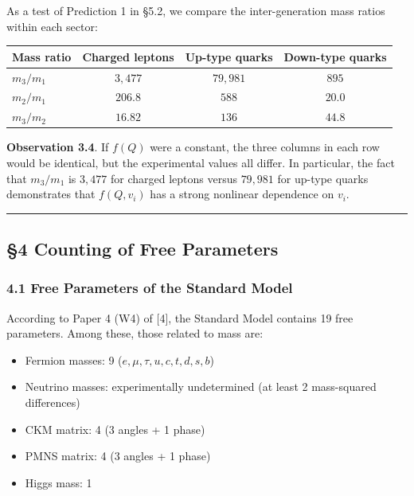 \documentclass[
  a4paper,11pt]{article}
\newcounter{none}
\providecommand{\tightlist}{%
  \setlength{\itemsep}{0pt}\setlength{\parskip}{0pt}}
\theoremstyle{definition}
\theoremstyle{remark}
\begin{document}
As a test of Prediction 1 in §5.2, we compare the inter-generation mass
ratios within each sector:

{\def\LTcaptype{none} %
\begin{longtable}[]{@{}lccc@{}}
\toprule\noalign{}
Mass ratio & Charged leptons & Up-type quarks & Down-type quarks \\
\midrule\noalign{}
\endhead
\bottomrule\noalign{}
\endlastfoot
\(m_3 / m_1\) & \(3{,}477\) & \(79{,}981\) & \(895\) \\
\(m_2 / m_1\) & \(206.8\) & \(588\) & \(20.0\) \\
\(m_3 / m_2\) & \(16.82\) & \(136\) & \(44.8\) \\
\end{longtable}
}

\textbf{Observation 3.4}. If \(f(Q)\) were a constant, the three columns
in each row would be identical, but the experimental values all differ.
In particular, the fact that \(m_3/m_1\) is \(3{,}477\) for charged
leptons versus \(79{,}981\) for up-type quarks demonstrates that
\(f(Q, v_i)\) has a strong nonlinear dependence on \(v_i\).

\begin{center}\rule{0.5\linewidth}{0.5pt}\end{center}

\subsection{§4 Counting of Free
Parameters}\label{counting-of-free-parameters}

\subsubsection{4.1 Free Parameters of the Standard
Model}\label{free-parameters-of-the-standard-model}

According to Paper 4 (W4) of {[}4{]}, the Standard Model contains 19
free parameters. Among these, those related to mass are:

\begin{itemize}
\tightlist
\item
  Fermion masses: 9 (\(e, \mu, \tau, u, c, t, d, s, b\))
\item
  Neutrino masses: experimentally undetermined (at least 2 mass-squared
  differences)
\item
  CKM matrix: 4 (3 angles + 1 phase)
\item
  PMNS matrix: 4 (3 angles + 1 phase)
\item
  Higgs mass: 1
\end{itemize}
\end{document}
